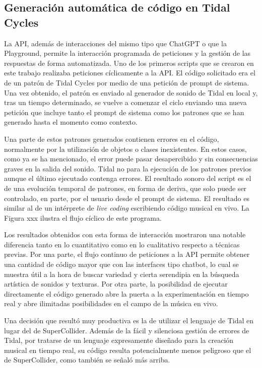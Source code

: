 \subsection{Generación automática de código en Tidal Cycles}
\label{sec:generacion_automatica_codigo_tidal_cycles}

La API, además de interacciones del mismo tipo que ChatGPT o que la Playground, permite la interacción programada de peticiones y la gestión de las respuestas de forma automatizada. Uno de los primeros scripts que se crearon en este trabajo realizaba peticiones cíclicamente a la API. El código solicitado era el de un patrón de Tidal Cycles por medio de una petición de prompt de sistema. Una vez obtenido, el patrón es enviado al generador de sonido de Tidal en local y, tras un tiempo determinado, se vuelve a comenzar el ciclo enviando una nueva petición que incluye tanto el prompt de sistema como los patrones que se han generado hasta el momento como contexto.

Una parte de estos patrones generados contienen errores en el código, normalmente por la utilización de objetos o clases inexistentes. En estos casos, como ya se ha mencionado, el error puede pasar desapercibido y sin consecuencias graves en la salida del sonido. Tidal no para la ejecución de los patrones previos aunque el último ejecutado contenga errores. El resultado sonoro del script es el de una evolución temporal de patrones, en forma de deriva, que solo puede ser controlado, en parte, por el usuario desde el prompt de sistema. El resultado es similar al de un intérprete de \emph{live coding} escribiendo código musical en vivo. La Figura xxx ilustra el flujo cíclico de este programa.


Los resultados obtenidos con esta forma de interacción mostraron una notable diferencia tanto en lo cuantitativo como en lo cualitativo respecto a técnicas previas. Por una parte, el flujo continuo de peticiones a la API permite obtener una cantidad de código mayor que con las interfaces tipo chatbot, lo cual se muestra útil a la hora de buscar variedad y cierta serendipia en la búsqueda artística de sonidos y texturas. Por otra parte, la posibilidad de ejecutar directamente el código generado abre la puerta a la experimentación en tiempo real y abre ilimitadas posibilidades en el campo de la música en vivo.

Una decisión que resultó muy productiva es la de utilizar el lenguaje de Tidal en lugar del de SuperCollider. Además de la fácil y silenciosa gestión de errores de Tidal, por tratarse de un lenguaje expresamente diseñado para la creación musical en tiempo real, su código resulta potencialmente menos peligroso que el de SuperCollider, como también se señaló más arriba. 

